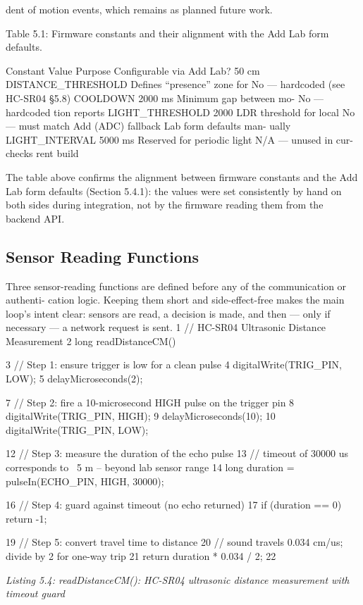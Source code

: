 dent of motion events, which remains as planned future work.

Table 5.1: Firmware constants and their alignment with the Add Lab form defaults.

Constant Value Purpose Conﬁgurable via Add
Lab?
50 cm
DISTANCE\_THRESHOLD Deﬁnes ``presence'' zone for No --- hardcoded (see
HC-SR04 §5.8)
COOLDOWN 2000 ms Minimum gap between mo- No --- hardcoded
tion reports
LIGHT\_THRESHOLD 2000 LDR threshold for local No --- must match Add
(ADC) fallback Lab form defaults man-
ually
LIGHT\_INTERVAL 5000 ms Reserved for periodic light N/A --- unused in cur-
checks rent build


The table above conﬁrms the alignment between ﬁrmware constants and the Add Lab
form defaults (Section 5.4.1): the values were set consistently by hand on both sides during
integration, not by the ﬁrmware reading them from the backend API.


\subsection{Sensor Reading Functions}


Three sensor-reading functions are deﬁned before any of the communication or authenti-
cation logic. Keeping them short and side-effect-free makes the main loop's intent clear:
sensors are read, a decision is made, and then --- only if necessary --- a network request is
sent.
1 // HC-SR04 Ultrasonic Distance Measurement
2 long readDistanceCM() {
3 // Step 1: ensure trigger is low for a clean pulse
4 digitalWrite(TRIG\_PIN, LOW);
5 delayMicroseconds(2);

7 // Step 2: fire a 10-microsecond HIGH pulse on the trigger pin
8 digitalWrite(TRIG\_PIN, HIGH);
9 delayMicroseconds(10);
10 digitalWrite(TRIG\_PIN, LOW);

12 // Step 3: measure the duration of the echo pulse
13 // timeout of 30000 us corresponds to ~5 m -- beyond lab sensor range
14 long duration = pulseIn(ECHO\_PIN, HIGH, 30000);





16 // Step 4: guard against timeout (no echo returned)
17 if (duration == 0) return -1;

19 // Step 5: convert travel time to distance
20 // sound travels 0.034 cm/us; divide by 2 for one-way trip
21 return duration * 0.034 / 2;
22 }


\textit{Listing 5.4: readDistanceCM(): HC-SR04 ultrasonic distance measurement with timeout guard}

